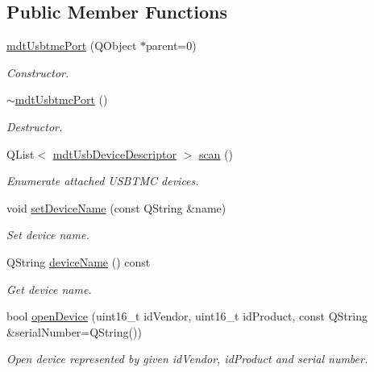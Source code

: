 \subsection*{Public Member Functions}
\begin{DoxyCompactItemize}
\item 
\hyperlink{classmdt_usbtmc_port_a102a2d5ebad4968621812e682d9d1b71}{mdt\-Usbtmc\-Port} (Q\-Object $\ast$parent=0)
\begin{DoxyCompactList}\small\item\em Constructor. \end{DoxyCompactList}\item 
\hyperlink{classmdt_usbtmc_port_a3f9d3f1f40f61e17fa2997f3ad181d30}{$\sim$mdt\-Usbtmc\-Port} ()
\begin{DoxyCompactList}\small\item\em Destructor. \end{DoxyCompactList}\item 
Q\-List$<$ \hyperlink{classmdt_usb_device_descriptor}{mdt\-Usb\-Device\-Descriptor} $>$ \hyperlink{classmdt_usbtmc_port_a8f555cd150a82b74322e2f109bb094f4}{scan} ()
\begin{DoxyCompactList}\small\item\em Enumerate attached U\-S\-B\-T\-M\-C devices. \end{DoxyCompactList}\item 
void \hyperlink{classmdt_usbtmc_port_ab01ac087b91a45bfaa252c9acf882106}{set\-Device\-Name} (const Q\-String \&name)
\begin{DoxyCompactList}\small\item\em Set device name. \end{DoxyCompactList}\item 
Q\-String \hyperlink{classmdt_usbtmc_port_a998ebe6f4dced400afcdbff1c4b83b77}{device\-Name} () const 
\begin{DoxyCompactList}\small\item\em Get device name. \end{DoxyCompactList}\item 
bool \hyperlink{classmdt_usbtmc_port_a0732cfb4ba24feef01dea7c3e2e86ca3}{open\-Device} (uint16\-\_\-t id\-Vendor, uint16\-\_\-t id\-Product, const Q\-String \&serial\-Number=Q\-String())
\begin{DoxyCompactList}\small\item\em Open device represented by given id\-Vendor, id\-Product and serial number. \end{DoxyCompactList}\item 

\end{DoxyCompactItemize}

